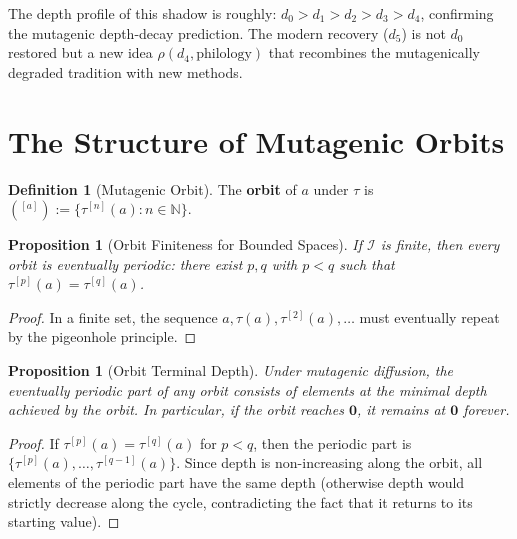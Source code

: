 \documentclass[11pt,openany]{book}
\theoremstyle{definition}
\newtheorem{definition}[axiom]{Definition}
\theoremstyle{plain}
\newtheorem{proposition}[axiom]{Proposition}
\theoremstyle{remark}
\newcommand{\IS}{\mathcal{I}}               %
\newcommand{\void}{\mathbf{0}}              %
\newcommand{\transmit}{\tau}                 %
\newcommand{\orbit}[2]{#1^{[#2]}}           %
\begin{document}
The depth profile of this shadow is roughly: $d_0 > d_1 > d_2 > d_3 > d_4$, confirming the mutagenic depth-decay prediction. The modern recovery ($d_5$) is not $d_0$ restored but a new idea $\rho(d_4, \text{philology})$ that recombines the mutagenically degraded tradition with new methods.

\section{The Structure of Mutagenic Orbits}

\begin{definition}[Mutagenic Orbit]
The \textbf{orbit} of $a$ under $\transmit$ is $\orbit(a) := \{\transmit^{[n]}(a) : n \in \mathbb{N}\}$.
\end{definition}

\begin{proposition}[Orbit Finiteness for Bounded Spaces]
If $\IS$ is finite, then every orbit is eventually periodic: there exist $p, q$ with $p < q$ such that $\transmit^{[p]}(a) = \transmit^{[q]}(a)$.
\end{proposition}

\begin{proof}
In a finite set, the sequence $a, \transmit(a), \transmit^{[2]}(a), \ldots$ must eventually repeat by the pigeonhole principle.
\end{proof}

\begin{proposition}[Orbit Terminal Depth]
Under mutagenic diffusion, the eventually periodic part of any orbit consists of elements at the minimal depth achieved by the orbit. In particular, if the orbit reaches $\void$, it remains at $\void$ forever.
\end{proposition}

\begin{proof}
If $\transmit^{[p]}(a) = \transmit^{[q]}(a)$ for $p < q$, then the periodic part is $\{\transmit^{[p]}(a), \ldots, \transmit^{[q-1]}(a)\}$. Since depth is non-increasing along the orbit, all elements of the periodic part have the same depth (otherwise depth would strictly decrease along the cycle, contradicting the fact that it returns to its starting value).
\end{proof}
\end{document}
